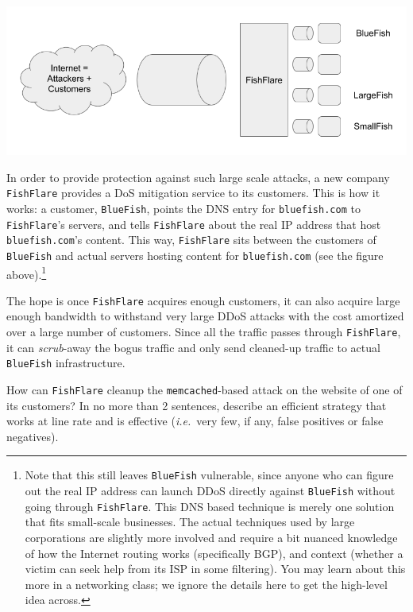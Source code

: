 \documentclass[12pt]{exam}
\newcommand{\solbox}[2]{%
\fbox{%
\parbox[c][#1][t]{\dimexpr\linewidth-2\fboxsep-2\fboxrule}{
  \hrule width \hsize height 0pt
  #2
 }%
}%
\par\vspace{\ht\strutbox}
}
\newcommand{\textfield}[3]{%
\iftoggle{pdfform}{%
\TextField[name = #1, backgroundcolor=white, height=#2,
width = \linewidth, multiline=true]{\mbox}%
}{%
\ifprintanswers\else{%
    \solbox{#2}{#3}}
\fi%
}%
}
\begin{document}
\begin{Form}
\begin{questions}
\begin{parts}
\includegraphics[scale=0.5]{FishFlare}

In order to provide protection against such large scale attacks, a new company
\texttt{FishFlare} provides a DoS mitigation service to its customers. This is
how it works: a customer, \texttt{BlueFish}, points the DNS entry for
\texttt{bluefish.com} to \texttt{FishFlare}'s servers, and tells
\texttt{FishFlare} about the real IP address that host \texttt{bluefish.com}'s
content. This way, \texttt{FishFlare} sits between the customers of
\texttt{BlueFish} and actual servers hosting content for \texttt{bluefish.com}
(see the figure above).\footnote{Note that this still leaves
\texttt{BlueFish} vulnerable, since anyone who can figure out the real IP
address can launch DDoS directly against \texttt{BlueFish} without going through
\texttt{FishFlare}. This DNS based technique is merely one solution that fits
small-scale businesses. The actual techniques used by large corporations are
slightly more involved and require a bit nuanced knowledge of how the Internet
routing works (specifically BGP), and context (whether a victim can seek help
from its ISP in some filtering). You may learn about this more in a networking
class; we ignore the details here to get the high-level idea across.}

The hope is once \texttt{FishFlare} acquires enough customers, it can also
acquire large enough bandwidth to withstand very large DDoS attacks with the
cost amortized over a large number of customers. Since all the traffic passes
through \texttt{FishFlare}, it can \emph{scrub}-away the bogus traffic and only
send cleaned-up traffic to actual \texttt{BlueFish} infrastructure.

How can \texttt{FishFlare} cleanup the \texttt{memcached}-based attack on the 
website of one of its customers? In no more than 2 sentences, describe an 
efficient strategy that works at line rate and is effective (\emph{i.e.}\ very
few, if any, false positives or false negatives).


\textfield{Q4P4}{3cm}{
Block all inbound traffics except established TCP connections or packets that try to establish a TCP connection.
}


\end{parts}
\end{questions}
\end{Form}
\end{document}
